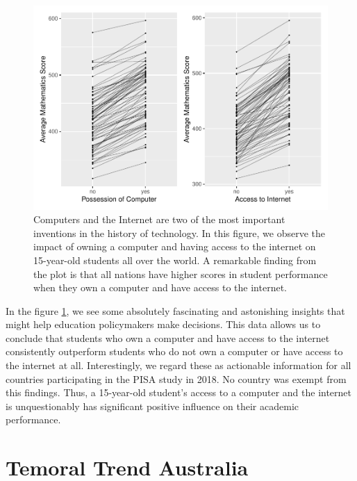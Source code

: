 \begin{Schunk}
\begin{figure}[H]
\includegraphics[width=1\linewidth]{learningtower_files/figure-latex/compint-plot-1} \caption[Computers and the Internet are two of the most important inventions in the history of technology]{Computers and the Internet are two of the most important inventions in the history of technology. In this figure, we observe the impact of owning a computer and having access to the internet on 15-year-old students all over the world. A remarkable finding from the plot is that all nations have higher scores in student performance when they own a computer and have access to the internet.}\label{fig:compint-plot}
\end{figure}
\end{Schunk}

In the figure \ref{fig:compint-plot}, we see some absolutely fascinating
and astonishing insights that might help education policymakers make
decisions. This data allows us to conclude that students who own a
computer and have access to the internet consistently outperform
students who do not own a computer or have access to the internet at
all. Interestingly, we regard these as actionable information for all
countries participating in the PISA study in 2018. No country was exempt
from this findings. Thus, a 15-year-old student's access to a computer
and the internet is unquestionably has significant positive influence on
their academic performance.

\hypertarget{temoral-trend-australia}{%
\section{Temoral Trend Australia}\label{temoral-trend-australia}}

